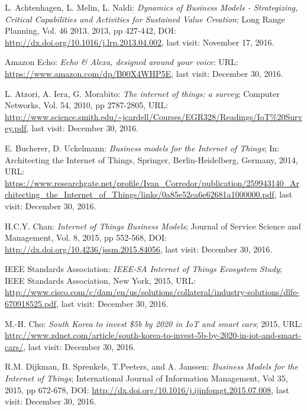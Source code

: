  \begin{thebibliography}{99}
  \setlength{\parskip}{1pt}
  \setlength{\itemsep}{1pt plus 0.3ex}
     L. Achtenhagen, L. Melin, L. Naldi: \emph{Dynamics of Business Models - Strategizing, Critical Capabilities and Activities for Sustained Value Creation}; Long Range Planning, Vol. 46 2013, 2013, pp 427-442, DOI: \url{http://dx.doi.org/10.1016/j.lrp.2013.04.002},  last visit: November 17, 2016.
	
	 Amazon Echo: \emph{Echo \& Alexa, designed around your voice}: URL: \url{https://www.amazon.com/dp/B00X4WHP5E}, last visit: December 30, 2016.

	 L. Atzori, A. Iera, G. Morabito: \emph{The internet of things: a survey}; Computer Networks, Vol. 54, 2010, pp 2787-2805, URL: \url{http://www.science.smith.edu/~jcardell/Courses/EGR328/Readings/IoT%20Survey.pdf}, last visit: December 30, 2016.

	 E. Bucherer, D. Uckelmann: \emph{Business models for the Internet of Things}; In: Architecting the Internet of Things, Springer, Berlin-Heidelberg, Germany, 2014, URL: \url{https://www.researchgate.net/profile/Ivan_Corredor/publication/259943140_Architecting_the_Internet_of_Things/links/0a85e52ea6e62681a1000000.pdf}, last visit: December 30, 2016.

	 H.C.Y. Chan: \emph{Internet of Things Business Models}; Journal of Service Science and Management, Vol. 8, 2015, pp 552-568, DOI: \url{http://dx.doi.org/10.4236/jssm.2015.84056}, last visit: December 30, 2016.

	 IEEE Standards Association: \emph{IEEE-SA Internet of Things Ecosystem Study}; IEEE Standards Association, New York, 2015, URL: \url{http://www.cisco.com/c/dam/en/us/solutions/collateral/industry-solutions/dlfe-670918525.pdf}, last visit: December 30, 2016.

	 M.-H. Cho: \emph{South Korea to invest \$5b by 2020 in IoT and smart cars}; 2015, URL: \url{http://www.zdnet.com/article/south-korea-to-invest-5b-by-2020-in-iot-and-smart-cars/}, last visit: December 30, 2016.

	 R.M. Dijkman, B. Sprenkels, T.Peeters, and A. Janssen: \emph{Business Models for the Internet of Things}; International Journal of Information Management, Vol 35, 2015, pp 672-678, DOI: \url{http://dx.doi.org/10.1016/j.ijinfomgt.2015.07.008}, last visit: December 30, 2016.


\end{thebibliography}

